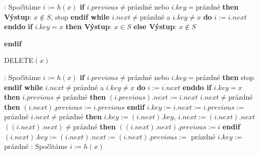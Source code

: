 :\newline 
Spo\v c\'\i t\'ame $i:=h(x)$\newline 
{\bf if} $i.previous\ne$pr\'azdn\'e nebo $i.key=$pr\'azdn\'e {\bf then V\'ystup}: $
x\notin S$, stop {\bf endif \newline 
while} $i.next\ne$pr\'azdn\'e a $i.key\ne x$ {\bf do} $i:=i.next$ {\bf enddo}\newline 
{\bf if} $i.key=x$ {\bf then V\'ystup}: $x\in S$ {\bf else V\'ystup}: $
x\notin S$ {\bf endif
\medskip

\flushpar DELETE$(x)$}:\newline 
Spo\v c\'\i t\'ame $i:=h(x)$\newline 
{\bf if} $i.previous\ne$pr\'azdn\'e nebo $i.key=$pr\'azdn\'e {\bf then} stop {\bf endif\newline 
while} $i.next\ne$pr\'azdn\'e a $i.key\ne x$ {\bf do} $i:=i.next$ {\bf enddo \newline 
if} $i.key=x$ {\bf then\newline} 
\phantom{---}{\bf if} $i.previous\ne$pr\'azdn\'e {\bf then\newline}
\phantom{------}$(i.previous).next:=i.next$\newline 
\phantom{------}{\bf if} $i.next\ne$pr\'azdn\'e {\bf then} $(i.n
ext).previous:=i.previous$ {\bf endif\newline} 
\phantom{------}$i.key:=i.next:=i.previous:=$ pr\'azdn\'e \newline 
\phantom{---}{\bf else}\newline 
\phantom{------}{\bf if} $i.next\ne$pr\'azdn\'e {\bf then\newline}
\phantom{---------}$i.key:=(i.next).key$, $i.next:=(i.next).next$\newline 
\phantom{---------}{\bf if} $((i.next).next)\ne$pr\'azdn\'e {\bf then} $
((i.next).next).previous:=i$ {\bf endif \newline} 
\phantom{---------}$(i.next).key:=(i.next).next:=(i.next).previous:=$ pr\'azdn\'e \newline 
\phantom{------}{\bf else}\newline 
\phantom{---------}$i.key:=$ pr\'azdn\'e \newline 
\phantom{------}{\bf endif}\newline 
\phantom{---}{\bf endif\newline 
endif
\medskip

\flushpar INSERT$(x)$}:\newline 
Spo\v c\'\i t\'ame $i:=h(x)$\newline 
